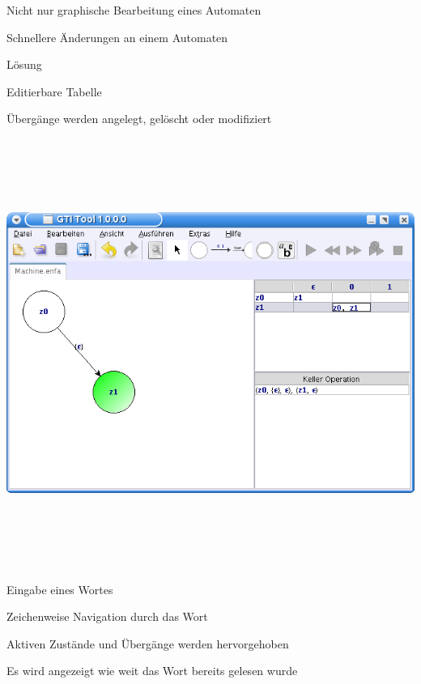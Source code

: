 {
    \begin{itemgroup}{}
	\item Nicht nur graphische Bearbeitung eines Automaten
	\item Schnellere Änderungen an einem Automaten
    \end{itemgroup}

    \begin{itemgroup}{Lösung}
	\item Editierbare Tabelle
	\item Übergänge werden angelegt, gelöscht oder modifiziert
	\end{itemgroup}
    
    \vfill{}
}


{
  \begin{center}
    \includegraphics[height=14cm]{../images/machine_table.png}
  \end{center}
}


{
    \begin{itemgroup}{}
	\item Eingabe eines Wortes
	\item Zeichenweise Navigation durch das Wort
	\item Aktiven Zustände und Übergänge werden hervorgehoben
	\item Es wird angezeigt wie weit das Wort bereits gelesen wurde
	\end{itemgroup}

	\vfill{}
}


